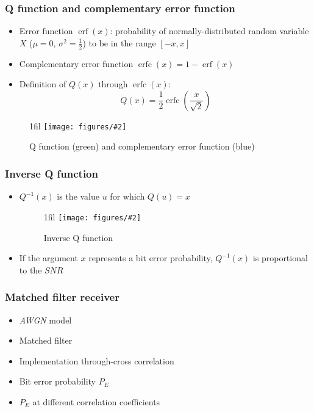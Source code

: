 \documentclass{beamer}
\makeatletter
\newcommand*{\centerfloat}{%
  \parindent \z@
  \leftskip \z@ \@plus 1fil \@minus \textwidth
  \rightskip\leftskip
  \parfillskip \z@skip}
\newcommand{\fig}[3]{
  \begin{figure}[H]
  \centerfloat
    \texttt{[image: figures/\#2]}
	\caption{#3}
  \end{figure}
}
\makeatother
\begin{document}
\begin{frame}
	\frametitle{Q function and complementary error function}
	\begin{itemize}
		\item Error function $\operatorname{erf}(x)$: probability of normally-distributed random variable $X$ ($\mu = 0$, $\sigma^2 = \frac{1}{2}$) to be in the range $[-x, x]$
		\item Complementary error function $\operatorname{erfc}(x) = 1 - \operatorname{erf}(x)$
		\item Definition of $Q(x)$ through $\operatorname{erfc}(x)$:
		\begin{equation}
			Q(x) = \frac{1}{2}\operatorname{erfc} \left(\frac{x}{\sqrt{2}} \right)
		\end{equation}
	\end{itemize}
	\fig{2cm}{q3.png}{Q function (green) and complementary error function (blue)}
\end{frame}

\begin{frame}
	\frametitle{Inverse Q function}
	\begin{itemize}
		\item $Q^{-1}(x)$ is the value $u$ for which $Q(u) = x$
		\fig{2cm}{q2.png}{Inverse Q function}
		\item If the argument $x$ represents a bit error probability, $Q^{-1}(x)$ is proportional to the $SNR$
	\end{itemize}
\end{frame}


\begin{frame}
	\frametitle{Matched filter receiver}
	\begin{itemize}
		\item \emph{AWGN} model
		\item Matched filter
		\item Implementation through-cross correlation
		\item Bit error probability $P_E$
		\item $P_E$ at different correlation coefficients
	\end{itemize}
\end{frame}
\end{document}
